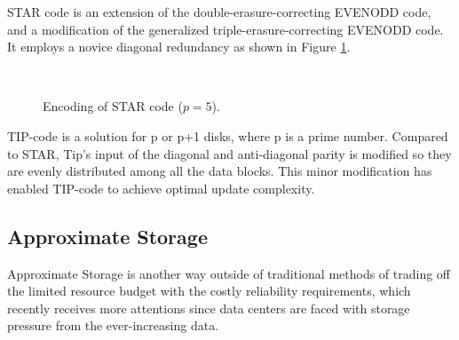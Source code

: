 \documentclass[sigconf]{acmart}
\begin{document}
STAR code \cite{STAR} is an extension of the double-erasure-correcting EVENODD \cite{EVENODD} code, and a modification of the generalized triple-erasure-correcting EVENODD code. It employs a novice diagonal redundancy as shown in Figure \ref{fig:star-enc}.
\begin{figure}[!ht]
 \centering
 \hspace{5pt}
  \\
 \hspace{5pt}
 \caption{Encoding of STAR code ($p = 5$).}
 \label{fig:star-enc}
\end{figure}

TIP-code \cite{tip} is a solution for p or p+1 disks, where p is a prime number. Compared to STAR, Tip's input of the diagonal and anti-diagonal parity is modified so they are evenly distributed among all the data blocks. This minor modification has enabled TIP-code to achieve optimal update complexity.


\subsection{Approximate Storage}
Approximate Storage is another way outside of traditional methods of trading off the limited resource budget with the costly reliability requirements, which recently receives more attentions since data centers are faced with storage pressure from the ever-increasing data.
\end{document}
